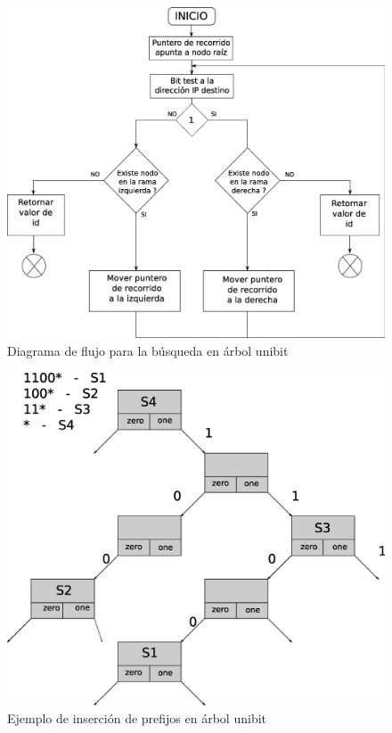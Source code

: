 \begin{figure}[H]
  \centering
	\includegraphics[scale=0.33]{4-implementacion/graf/utlsearch.eps}
  \caption{Diagrama de flujo para la búsqueda en árbol unibit}
  \label{fig:utlsearch}
\end{figure}

\begin{figure}[!h]
  \centering
	\includegraphics[scale=0.33]{4-implementacion/graf/lluinsert09.eps}
  \caption{Ejemplo de inserción de prefijos en árbol unibit}
  \label{fig:lluinsert}
\end{figure}

